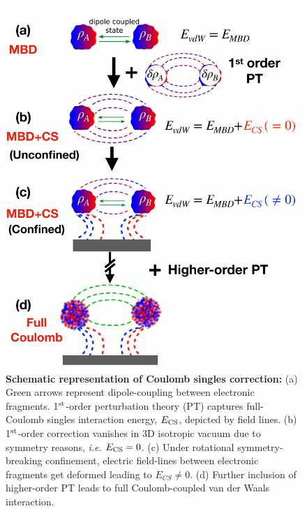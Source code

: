 \documentclass[aps,prl,groupaddress, twocolumn]{revtex4-1}  %
\begin{document}
\begin{figure}[h]
\includegraphics[scale=0.45]{Plots/Schematic_new.pdf}
\caption{\textbf{Schematic representation of Coulomb singles correction:} (a) Green arrows represent dipole-coupling between electronic fragments. 1$^{\rm st}$-order perturbation theory (PT) captures full-Coulomb singles interaction energy, $E_{\rm CS}$, depicted by field lines. (b) 1$^{\rm st}$-order correction vanishes in 3D isotropic vacuum due to symmetry reasons, \textit{i.e.} $E_{\rm CS} = 0$. (c) Under rotational symmetry-breaking confinement, electric field-lines between electronic fragments get deformed leading to $E_{CS} \neq 0$. (d) Further inclusion of higher-order PT leads to full Coulomb-coupled van der Waals interaction.}\label{fig:schematic}
\end{figure}
\end{document}

